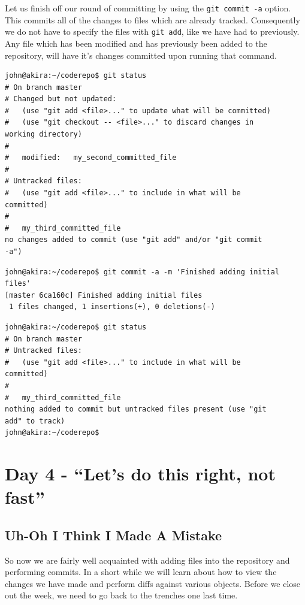 Let us finish off our round of committing by using the \texttt{git commit -a} option.  This commits all of the changes to files which are already tracked.  Consequently we do not have to specify the files with \texttt{git add}, like we have had to previously.  Any file which has been modified and has previously been added to the repository, will have it's changes committed upon running that command.

\begin{Verbatim}[frame=leftline,framerule=1mm,fontsize=\relsize{-3}] 
john@akira:~/coderepo$ git status 
# On branch master 
# Changed but not updated: 
#   (use "git add <file>..." to update what will be committed) 
#   (use "git checkout -- <file>..." to discard changes in 
working directory) 
# 
#	modified:   my_second_committed_file 
# 
# Untracked files: 
#   (use "git add <file>..." to include in what will be 
committed) 
# 
#	my_third_committed_file 
no changes added to commit (use "git add" and/or "git commit 
-a")
\end{Verbatim} 

\begin{Verbatim}[frame=leftline,framerule=1mm,fontsize=\relsize{-3}] 
john@akira:~/coderepo$ git commit -a -m 'Finished adding initial 
files' 
[master 6ca160c] Finished adding initial files 
 1 files changed, 1 insertions(+), 0 deletions(-) 
\end{Verbatim} 

\begin{Verbatim}[frame=leftline,framerule=1mm,fontsize=\relsize{-3}] 
john@akira:~/coderepo$ git status 
# On branch master 
# Untracked files: 
#   (use "git add <file>..." to include in what will be 
committed) 
# 
#	my_third_committed_file 
nothing added to commit but untracked files present (use "git 
add" to track) 
john@akira:~/coderepo$ 
\end{Verbatim} 

\section{Day 4 - ``Let's do this right, not fast''}

\subsection{Uh-Oh I Think I Made A Mistake}

So now we are fairly well acquainted with adding files into the repository and performing commits.  In a short while we will learn about how to view the changes we have made and perform diffs against various objects.  Before we close out the week, we need to go back to the trenches one last time.


